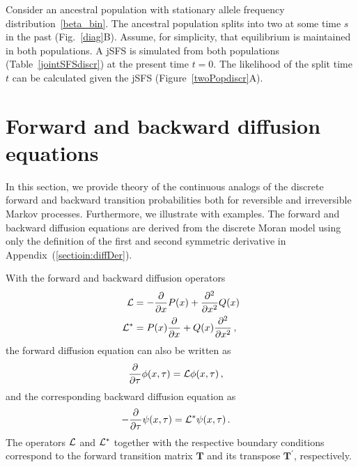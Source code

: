 \documentclass[preprint]{elsarticle}
\begin{document}
Consider an ancestral population with stationary allele frequency distribution~\eqref{beta_bin}. The ancestral population splits into two at some time $s$ in the past (Fig.~\ref{diag}B). Assume, for simplicity, that equilibrium is maintained in both populations. A jSFS is simulated from both populations (Table~\ref{jointSFSdiscr}) at the present time $t=0$. The likelihood of the split time $t$ can be calculated given the jSFS (Figure~\ref{twoPopdiscr}A).



\section{Forward and backward diffusion equations}\label{forwBackDiff}

In this section, we provide theory of the continuous analogs of the discrete forward and backward transition probabilities both for reversible and irreversible Markov processes. Furthermore, we illustrate with examples.
The forward and backward diffusion equations are derived from the discrete Moran model using only the definition of the first and second symmetric derivative in Appendix~(\ref{sectioin:diffDer}).

With the forward and backward diffusion operators 
\begin{equation}
 \begin{split}
     {\cal L}&=-\frac{\partial}{\partial x}P(x)+ \frac{\partial^2}{\partial x^2}Q(x)\\
     {\cal L}^{*}&=P(x)\frac{\partial}{\partial x} +Q(x)\frac{\partial^2}{\partial x^2}\,,
 \end{split}
\end{equation}
the forward diffusion equation can also be written as
\begin{equation}\label{eq:forw_general}
\begin{split}
\frac{\partial}{\partial \tau}\phi(x,\tau)&={\cal L} \phi(x, \tau)\,,
\end{split}
\end{equation}
and the corresponding backward diffusion equation as
\begin{equation}\label{eq:backw_general}
\begin{split}
-\frac{\partial}{\partial \tau}\psi(x,\tau)&={\cal L}^{*} \psi(x, \tau)\,.
\end{split}
\end{equation}
The operators ${\cal L}$ and ${\cal L}^{*}$ together with the respective boundary conditions correspond to the forward transition matrix $\mathbf{T}$ and its transpose $\mathbf{T}^{'}$, respectively. 
\end{document}
